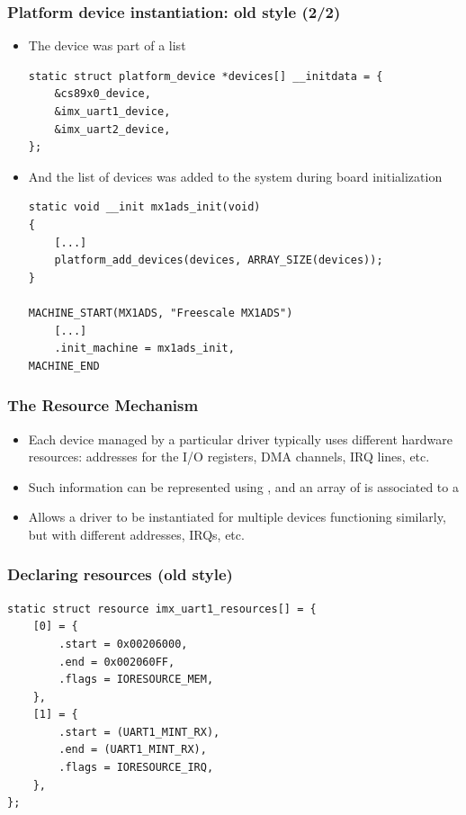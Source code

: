 \begin{frame}[fragile]
  \frametitle{Platform device instantiation: old style (2/2)}
  \begin{itemize}
  \item The device was part of a list
    \begin{block}{}
  \begin{verbatim}
static struct platform_device *devices[] __initdata = {
    &cs89x0_device,
    &imx_uart1_device,
    &imx_uart2_device,
};
  \end{verbatim}
  \end{block}
  \item And the list of devices was added to the system during
    board initialization
    \begin{block}{}
  \begin{verbatim}
static void __init mx1ads_init(void)
{
    [...]
    platform_add_devices(devices, ARRAY_SIZE(devices));
}

MACHINE_START(MX1ADS, "Freescale MX1ADS")
    [...]
    .init_machine = mx1ads_init,
MACHINE_END
  \end{verbatim}
  \end{block}
  \end{itemize}
\end{frame}

\begin{frame}
  \frametitle{The Resource Mechanism}
  \begin{itemize}
  \item Each device managed by a particular driver typically uses
    different hardware resources: addresses for the I/O registers, DMA
    channels, IRQ lines, etc.
  \item Such information can be represented using
    , and an array of  is
    associated to a 
  \item Allows a driver to be instantiated for multiple devices
    functioning similarly, but with different addresses, IRQs, etc.
  \end{itemize}
\end{frame}

\begin{frame}[fragile]
  \frametitle{Declaring resources (old style)}
  \begin{block}{}
  \begin{verbatim}
static struct resource imx_uart1_resources[] = {
    [0] = {
        .start = 0x00206000,
        .end = 0x002060FF,
        .flags = IORESOURCE_MEM,
    },
    [1] = {
        .start = (UART1_MINT_RX),
        .end = (UART1_MINT_RX),
        .flags = IORESOURCE_IRQ,
    },
};
\end{verbatim}
\end{block}
\end{frame}

